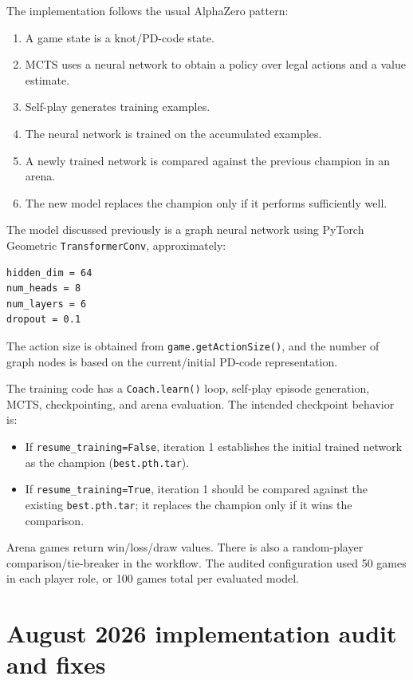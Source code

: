 \documentclass[11pt]{article}
\begin{document}
The implementation follows the usual AlphaZero pattern:

\begin{enumerate}[label=\arabic*.]
    \item A game state is a knot/PD-code state.
    \item MCTS uses a neural network to obtain a policy over legal actions and a value estimate.
    \item Self-play generates training examples.
    \item The neural network is trained on the accumulated examples.
    \item A newly trained network is compared against the previous champion in an arena.
    \item The new model replaces the champion only if it performs sufficiently well.
\end{enumerate}

The model discussed previously is a graph neural network using PyTorch Geometric \texttt{TransformerConv}, approximately:

\begin{verbatim}
hidden_dim = 64
num_heads = 8
num_layers = 6
dropout = 0.1
\end{verbatim}

The action size is obtained from \texttt{game.getActionSize()}, and the number of graph nodes is based on the current/initial PD-code representation.

The training code has a \texttt{Coach.learn()} loop, self-play episode generation, MCTS, checkpointing, and arena evaluation. The intended checkpoint behavior is:

\begin{itemize}
    \item If \texttt{resume\_training=False}, iteration 1 establishes the initial trained network as the champion (\texttt{best.pth.tar}).
    \item If \texttt{resume\_training=True}, iteration 1 should be compared against the existing \texttt{best.pth.tar}; it replaces the champion only if it wins the comparison.
\end{itemize}

Arena games return win/loss/draw values. There is also a random-player comparison/tie-breaker in the workflow. The audited configuration used 50 games in each player role, or 100 games total per evaluated model.

\section{August 2026 implementation audit and fixes}
\end{document}
